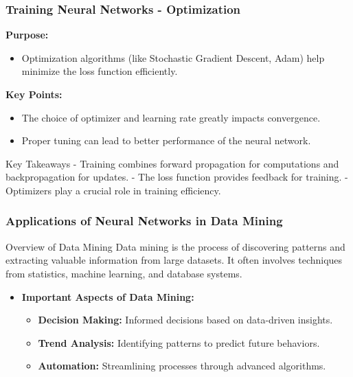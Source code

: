 \documentclass[aspectratio=169]{beamer}
\begin{document}
\begin{frame}[fragile]
    \frametitle{Training Neural Networks - Optimization}
    \textbf{Purpose:}
    \begin{itemize}
        \item Optimization algorithms (like Stochastic Gradient Descent, Adam) help minimize the loss function efficiently.
    \end{itemize}

    \textbf{Key Points:}
    \begin{itemize}
        \item The choice of optimizer and learning rate greatly impacts convergence.
        \item Proper tuning can lead to better performance of the neural network.
    \end{itemize}

    \begin{block}{Key Takeaways}
        - Training combines forward propagation for computations and backpropagation for updates.
        - The loss function provides feedback for training.
        - Optimizers play a crucial role in training efficiency.
    \end{block}
\end{frame}

\begin{frame}[fragile]
    \frametitle{Applications of Neural Networks in Data Mining}
    
    \begin{block}{Overview of Data Mining}
        Data mining is the process of discovering patterns and extracting valuable information from large datasets. 
        It often involves techniques from statistics, machine learning, and database systems.
    \end{block}

    \begin{itemize}
        \item \textbf{Important Aspects of Data Mining:}
        \begin{itemize}
            \item \textbf{Decision Making:} Informed decisions based on data-driven insights.
            \item \textbf{Trend Analysis:} Identifying patterns to predict future behaviors.
            \item \textbf{Automation:} Streamlining processes through advanced algorithms.
        \end{itemize}
    \end{itemize}
\end{frame}
\end{document}
